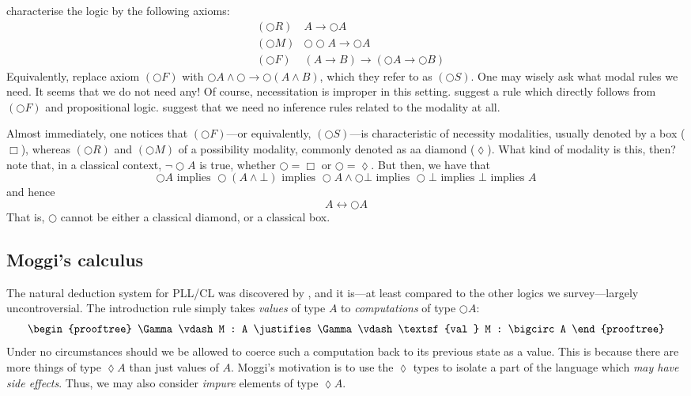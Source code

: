 \documentclass[a4paper]{amsart}
\begin{document}
\cite{Fairtlough1995} characterise the logic by
the following axioms: \begin{align*}
  &(\bigcirc R) &A \rightarrow \bigcirc A \\
  &(\bigcirc M) &\bigcirc \bigcirc A \rightarrow \bigcirc A \\
  &(\bigcirc F) &(A \rightarrow B) \rightarrow (\bigcirc A
  \rightarrow \bigcirc B)
\end{align*} Equivalently, \cite{Fairtlough1997} replace axiom
$(\bigcirc F)$ with $\bigcirc A \land \bigcirc \rightarrow
\bigcirc (A \land B)$, which they refer to as $(\bigcirc S)$. One
may wisely ask what modal rules we need. It seems that we do not
need any! Of course, necessitation is improper in this setting.
\cite{Fairtlough1997} suggest a rule which directly follows from
$(\bigcirc F)$ and propositional logic. \cite{Benton1998} suggest
that we need no inference rules related to the modality at all.

Almost immediately, one notices that $(\bigcirc F)$---or
equivalently, $(\bigcirc S)$---is characteristic of necessity
modalities, usually denoted by a box ($\Box$), whereas $(\bigcirc
R)$ and $(\bigcirc M)$ of a possibility modality, commonly denoted
as aa diamond ($\lozenge$). What kind of modality is this, then?
\cite{Fairtlough1997} note that, in a classical context,
$\lnot\bigcirc A$ is true, whether $\bigcirc = \Box$ or $\bigcirc
= \lozenge$. But then, we have that \[
  \bigcirc A \text{ implies }
  \bigcirc \left(A \land \bot\right) \text{ implies }
  \bigcirc A \land \bigcirc \bot \text{ implies }
  \bigcirc \bot \text{ implies }
  \bot \text{ implies }
  A
\] and hence \[
  A \leftrightarrow \bigcirc A
\] That is, $\bigcirc$ cannot be either a classical diamond, or a
classical box.

\subsection{Moggi's calculus}

The natural deduction system for \textsf{PLL/CL} was discovered by
\cite{Moggi1989, Moggi1991}, and it is---at least compared to the other
logics we survey---largely uncontroversial. The introduction
rule simply takes \emph{values} of type $A$ to \emph{computations}
of type $\bigcirc A$: \[ \begin{prooftree}
  \Gamma \vdash M : A
    \justifies
  \Gamma \vdash \textsf{val } M : \bigcirc A
\end{prooftree} \] Under no circumstances should we be allowed to
coerce such a computation back to its previous state as a value.
This is because there are more things of type $\lozenge A$ than
just values of $A$. Moggi's motivation is to use the $\lozenge$
types to isolate a part of the language which \emph{may have side
effects}. Thus, we may also consider \emph{impure} elements of
type $\lozenge A$.
\end{document}

